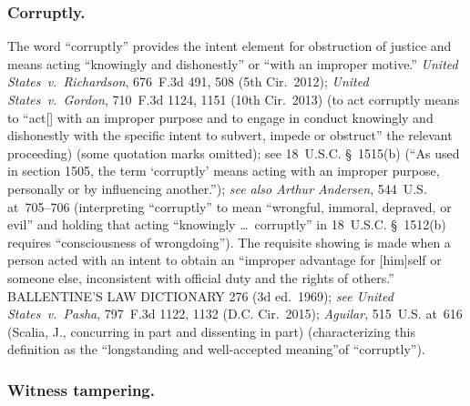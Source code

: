 \subsubsection*{Corruptly.}

The word ``corruptly'' provides the intent element for obstruction of justice and means acting ``knowingly and dishonestly'' or ``with an improper motive.''
\textit{United States~v.\ Richardson}, 676~F.3d 491, 508 (5th Cir.~2012);
\textit{United States~v.\ Gordon}, 710~F.3d 1124, 1151 (10th Cir.~2013) (to act corruptly means to ``act[] with an improper purpose and to engage in conduct knowingly and dishonestly with the specific intent to subvert, impede or obstruct'' the relevant proceeding) (some quotation marks omitted);
see 18~U.S.C. \S~1515(b) (``As used in section 1505, the term `corruptly' means acting with an improper purpose, personally or by influencing another.'');
\textit{see also Arthur Andersen}, 544~U.S. at~705--706 (interpreting ``corruptly'' to mean ``wrongful, immoral, depraved, or evil'' and holding that acting ``knowingly \dots\ corruptly'' in 18~U.S.C. \S~1512(b) requires ``consciousness of wrongdoing'').
The requisite showing is made when a person acted with an intent to obtain an ``improper advantage for [him]self or someone else, inconsistent with official duty and the rights of others.''
BALLENTINE'S LAW DICTIONARY 276 (3d ed.~1969);
\textit{see United States~v.\ Pasha}, 797~F.3d 1122, 1132 (D.C. Cir.~2015);
\textit{Aguilar}, 515~U.S. at~616 (Scalia, J., concurring in part and dissenting in part) (characterizing this definition as the ``longstanding and well-accepted meaning''of ``corruptly'').

\subsubsection*{Witness tampering.}

